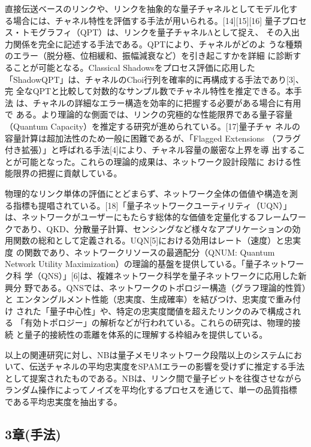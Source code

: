 \documentclass[conference]{IEEEtran}
\begin{document}
直接伝送ベースのリンクや、リンクを抽象的な量子チャネルとしてモデル化す
る場合には、チャネル特性を評価する手法が用いられる。[14][15][16]
量子プロセス・トモグラフィ（QPT）は、リンクを量子チャネルΛとして捉え、
その入出力関係を完全に記述する手法である。QPTにより、チャネルがどのよ
うな種類のエラー（脱分極、位相緩和、振幅減衰など）を引き起こすかを詳細
に診断することが可能となる。Classical Shadowsをプロセス評価に応用した
「ShadowQPT」は、チャネルのChoi行列を確率的に再構成する手法であり[3]、完
全なQPTと比較して対数的なサンプル数でチャネル特性を推定できる。本手法
は、チャネルの詳細なエラー構造を効率的に把握する必要がある場合に有用で
ある。より理論的な側面では、リンクの究極的な性能限界である量子容量
（Quantum Capacity）を推定する研究が進められている。[17]量子チャ
ネルの容量計算は超加法性のため一般に困難であるが、「Flagged Extensions
（フラグ付き拡張）」と呼ばれる手法[4]により、チャネル容量の厳密な上界を導
出することが可能となった。これらの理論的成果は、ネットワーク設計段階に
おける性能限界の把握に貢献している。

物理的なリンク単体の評価にとどまらず、ネットワーク全体の価値や構造を測
る指標も提唱されている。[18]「量子ネットワークユーティリティ（UQN）」
は、ネットワークがユーザーにもたらす総体的な価値を定量化するフレームワー
クであり、QKD、分散量子計算、センシングなど様々なアプリケーションの効
用関数の総和として定義される。UQN[5]における効用はレート（速度）と忠実度
の関数であり、ネットワークリソースの最適配分（QNUM: Quantum Network
Utility Maximization）の理論的基盤を提供している。「量子ネットワーク科
学（QNS）」[6]は、複雑ネットワーク科学を量子ネットワークに応用した新興分
野である。QNSでは、ネットワークのトポロジー構造（グラフ理論的性質）と
エンタングルメント性能（忠実度、生成確率）を結びつけ、忠実度で重み付け
された「量子中心性」や、特定の忠実度閾値を超えたリンクのみで構成される
「有効トポロジー」の解析などが行われている。これらの研究は、物理的接続
と量子的接続性の乖離を体系的に理解する枠組みを提供している。


以上の関連研究に対し、NBは量子メモリネットワーク段階以上のシステムにお
いて、伝送チャネルの平均忠実度をSPAMエラーの影響を受けずに推定する手法
として提案されたものである。NBは、リンク間で量子ビットを往復させながら
ランダム操作によってノイズを平均化するプロセスを通じて、単一の品質指標
である平均忠実度を抽出する。




\subsection*{3章(手法)}
\label{sec:orgfd8c6a9}
\end{document}
